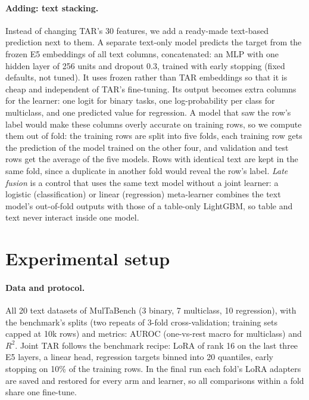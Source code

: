 \documentclass{article}
\begin{document}
\paragraph{Adding: text stacking.} Instead of changing TAR's 30 features, we add a ready-made text-based
prediction next to them. A separate text-only model predicts the target from the frozen E5 embeddings of all text
columns, concatenated: an MLP with one hidden layer of 256 units and dropout 0.3, trained with early stopping (fixed
defaults, not tuned). It uses frozen rather than TAR embeddings so that it is cheap and independent of TAR's
fine-tuning. Its output becomes extra columns for the learner: one logit for binary tasks, one log-probability per
class for multiclass, and one predicted value for regression. A model that saw the row's label would make these columns overly accurate on training rows, so we compute them out of fold: the training rows are split into five folds, each training row gets the prediction of the
model trained on the other four, and validation and test rows get the average of the five models. Rows with
identical text are kept in the same fold, since a duplicate in another fold would reveal the row's label.
\emph{Late fusion} is a control that uses the same text model without a joint learner: a logistic (classification)
or linear (regression) meta-learner combines the text model's out-of-fold outputs with those of a table-only
LightGBM, so table and text never interact inside one model.


\section{Experimental setup}\label{sec:setup}

\paragraph{Data and protocol.}  All 20 text datasets of MulTaBench (3 binary, 7 multiclass, 10 regression), with the
benchmark's splits (two repeats of 3-fold cross-validation; training sets capped at 10k rows) and metrics: AUROC
(one-vs-rest macro for multiclass) and $R^2$. Joint TAR follows the benchmark recipe: LoRA \citep{hu2022lora} of rank
16 on the last three E5 layers, a linear head, regression targets binned into 20 quantiles, early stopping on 10\% of
the training rows. In the final run each fold's LoRA adapters are saved and restored for every arm and learner, so
all comparisons within a fold share one fine-tune.
\end{document}
